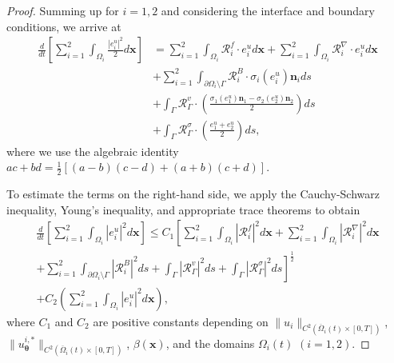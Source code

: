 \documentclass{article}
\newtheorem{proof}{Proof}[section]
\begin{document}
\begin{proof}
Summing up for $i = 1, 2$ and considering the interface and boundary conditions, we arrive at
\begin{equation}
\begin{aligned}
\frac{d}{dt}\left[\sum_{i=1}^{2} \int_{\Omega_i} \frac{|e^u_i|^2}{2} d\boldsymbol{x}\right] 
&= \sum_{i=1}^{2} \int_{\Omega_i} \mathcal{R}^f_i \cdot e^u_i d\boldsymbol{x} + \sum_{i=1}^{2} \int_{\Omega_i} \mathcal{R}^{\nabla}_i \cdot e^u_i d\boldsymbol{x} \\
&+ \sum_{i=1}^{2} \int_{\partial\Omega_i \setminus \Gamma} \mathcal{R}^{B}_i \cdot \sigma_i(e^u_i) \boldsymbol{n}_i ds \\
&+ \int_{\Gamma} \mathcal{R}^v_{\Gamma} \cdot \left(\frac{\sigma_1(e^u_1)\boldsymbol{n}_1 - \sigma_2(e^u_2)\boldsymbol{n}_2}{2}\right) ds \\
&+ \int_{\Gamma} \mathcal{R}^{\sigma}_{\Gamma} \cdot \left(\frac{e^u_1 + e^u_2}{2}\right) ds,
\end{aligned}
\end{equation}
where we use the algebraic identity $ac + bd = \frac{1}{2}[(a-b)(c-d) + (a+b)(c+d)]$. 

To estimate the terms on the right-hand side, we apply the Cauchy-Schwarz inequality, Young's inequality, and appropriate trace theorems to obtain
\begin{equation}
\begin{aligned}
\frac{d}{dt}\left[\sum_{i=1}^{2} \int_{\Omega_i} |e^u_i|^2 d\boldsymbol{x}\right] \leq C_1 \left[\sum_{i=1}^{2} \int_{\Omega_i} |\mathcal{R}^f_i|^2 d\boldsymbol{x} + \sum_{i=1}^{2} \int_{\Omega_i} |\mathcal{R}^{\nabla}_i|^2 d\boldsymbol{x} \right. \\
\left. + \sum_{i=1}^{2} \int_{\partial\Omega_i \setminus \Gamma} |\mathcal{R}^{B}_i|^2 ds + \int_{\Gamma} |\mathcal{R}^v_{\Gamma}|^2 ds + \int_{\Gamma} |\mathcal{R}^{\sigma}_{\Gamma}|^2 ds\right]^{\frac{1}{2}} \\
+ C_2 \left(\sum_{i=1}^{2} \int_{\Omega_i} |e^u_i|^2 d\boldsymbol{x}\right),
\end{aligned}
\end{equation}
where $C_1$ and $C_2$ are positive constants depending on $\|u_i\|_{C^2(\overline{\Omega}_i(t) \times [0,T])}$, $\|u_{\boldsymbol{\theta}}^{i,*}\|_{C^2(\overline{\Omega}_i(t) \times [0,T])}$, $\beta(\boldsymbol{x})$, and the domains $\Omega_i(t)$ $(i = 1, 2)$. 


\end{proof}
\end{document}
